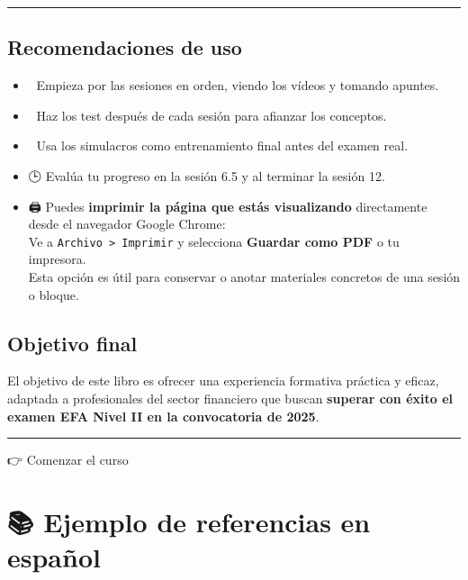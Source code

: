 \documentclass[
  letterpaper,
  DIV=11,
  numbers=noendperiod]{scrreprt}
\providecommand{\tightlist}{%
  \setlength{\itemsep}{0pt}\setlength{\parskip}{0pt}}\usepackage{longtable,booktabs,array}
\begin{document}
\begin{center}\rule{0.5\linewidth}{0.5pt}\end{center}

\section{Recomendaciones de uso}\label{recomendaciones-de-uso}

\begin{itemize}
\tightlist
\item
  📅 Empieza por las sesiones en orden, viendo los vídeos y tomando
  apuntes.\\
\item
  🧠 Haz los test después de cada sesión para afianzar los conceptos.\\
\item
  📝 Usa los simulacros como entrenamiento final antes del examen
  real.\\
\item
  🕒 Evalúa tu progreso en la sesión 6.5 y al terminar la sesión 12.\\
\item
  🖨️ Puedes \textbf{imprimir la página que estás visualizando}
  directamente desde el navegador Google Chrome:\\
  Ve a \texttt{Archivo\ \textgreater{}\ Imprimir} y selecciona
  \textbf{Guardar como PDF} o tu impresora.\\
  Esta opción es útil para conservar o anotar materiales concretos de
  una sesión o bloque.
\end{itemize}

\section{Objetivo final}\label{objetivo-final}

El objetivo de este libro es ofrecer una experiencia formativa práctica
y eficaz, adaptada a profesionales del sector financiero que buscan
\textbf{superar con éxito el examen EFA Nivel II en la convocatoria de
2025}.

\begin{center}\rule{0.5\linewidth}{0.5pt}\end{center}

👉 Comenzar el curso


\chapter{📚 Ejemplo de referencias en
español}\label{ejemplo-de-referencias-en-espauxf1ol}
\end{document}
